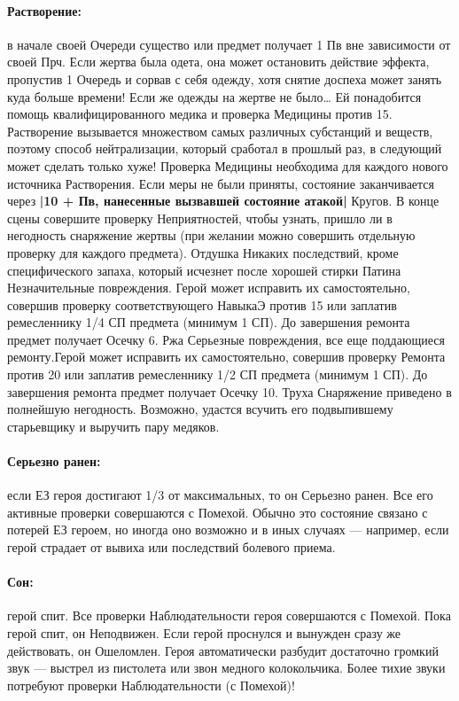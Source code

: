 \paragraph{Растворение:} в начале своей Очереди существо или предмет получает 1 Пв вне зависимости от своей Прч. Если жертва была одета, она может остановить действие эффекта, пропустив 1 Очередь и сорвав с себя одежду, хотя снятие доспеха может занять куда больше времени! Если же одежды на жертве не было… Ей понадобится помощь квалифицированного медика и проверка Медицины против 15. Растворение вызывается множеством самых различных субстанций и веществ, поэтому способ нейтрализации, который сработал в прошлый раз, в следующий может сделать только хуже! Проверка Медицины необходима для каждого нового источника Растворения.
\newline
Если меры не были приняты, состояние заканчивается через \textbf{|10 + Пв, нанесенные вызвавшей состояние атакой|} Кругов. В конце сцены совершите проверку Неприятностей, чтобы узнать, пришло ли в негодность снаряжение жертвы (при желании можно совершить отдельную проверку для каждого предмета).
\trouble
{Отдушка}%
{Никаких последствий, кроме специфического запаха, который исчезнет после хорошей стирки}%
{Патина}%
{Незначительные повреждения. Герой может исправить их самостоятельно, совершив проверку соответствующего НавыкаЭ против 15 или заплатив ремесленнику 1/4 СП предмета (минимум 1 СП). До завершения ремонта предмет получает Осечку 6.}%
{Ржа}%
{Серьезные повреждения, все еще поддающиеся ремонту.Герой может исправить их самостоятельно, совершив проверку Ремонта против 20 или заплатив ремесленнику 1/2 СП предмета (минимум 1 СП). До завершения ремонта предмет получает Осечку 10.}%
{Труха}%
{Снаряжение приведено в полнейшую негодность. Возможно, удастся всучить его подвыпившему старьевщику и выручить пару медяков.}%
\paragraph{Серьезно ранен:} если ЕЗ героя достигают 1/3 от максимальных, то он Серьезно ранен. Все его активные проверки совершаются с Помехой. Обычно это состояние связано с потерей ЕЗ героем, но иногда оно возможно и в иных случаях — например, если герой страдает от вывиха или последствий болевого приема.
\paragraph{Сон:} герой спит. Все проверки Наблюдательности героя совершаются с Помехой. Пока герой спит, он Неподвижен. Если герой проснулся и вынужден сразу же действовать, он Ошеломлен. Героя автоматически разбудит достаточно громкий звук — выстрел из пистолета или звон медного колокольчика. Более тихие звуки потребуют проверки Наблюдательности (с Помехой)!
